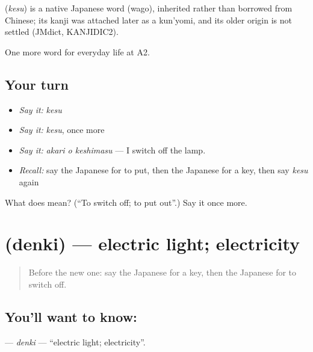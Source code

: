 \begin{cousinweb}
\textbf{} (\emph{kesu}) is a native Japanese word (wago), inherited rather than borrowed from Chinese; its kanji was attached later as a kun'yomi, and its older origin is not settled (JMdict, KANJIDIC2).
\end{cousinweb}

\begin{grammarlens}[title={What you've built}]
One more word for everyday life at A2.
\end{grammarlens}

\subsection*{Your turn}
\begin{itemize}
\raggedright
  \item \emph{Say it:} \emph{kesu}
  \item \emph{Say it:} \emph{kesu}, once more
  \item \emph{Say it:} \emph{akari o keshimasu} — I switch off the lamp.
  \item \emph{Recall:} say the Japanese for to put, then the Japanese for a key, then say \emph{kesu} again
\end{itemize}

\begin{tcolorbox}[breakable,colback=teal!4,colframe=teal!35!black,title={Before you move on}]
What does  mean? (\textquotedblleft{}To switch off; to put out\textquotedblright{}.) Say it once more.
\end{tcolorbox}
\section[\texorpdfstring{\ja{でんき} (denki)}{でんき (denki)}]{ (denki) — electric light; electricity}

\label{lesson:JA-C158-denki}



\begin{quote}
Before the new one: say the Japanese for a key, then the Japanese for to switch off.
\end{quote}

\subsection*{You'll want to know: }
\textbf{} — \emph{denki} — \textquotedblleft{}electric light; electricity\textquotedblright{}.

